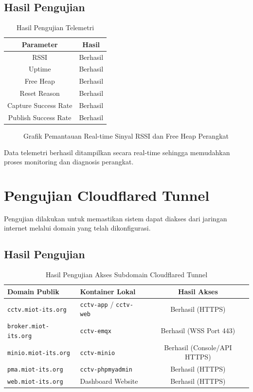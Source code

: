 \subsection{Hasil Pengujian}

\begin{table}[H]
	\centering
	\caption{Hasil Pengujian Telemetri}
	\begin{tabular}{|c|c|}
		\hline
		Parameter & Hasil \\
		\hline
		RSSI & Berhasil \\
		Uptime & Berhasil \\
		Free Heap & Berhasil \\
		Reset Reason & Berhasil \\
		Capture Success Rate & Berhasil \\
		Publish Success Rate & Berhasil \\
		\hline
	\end{tabular}
\end{table}

\begin{figure}[H]
\centering
\caption{Grafik Pemantauan Real-time Sinyal RSSI dan Free Heap Perangkat}
\label{fig:telemetry_graph}
\end{figure}

Data telemetri berhasil ditampilkan secara real-time sehingga memudahkan proses monitoring dan diagnosis perangkat.

\section{Pengujian Cloudflared Tunnel}

Pengujian dilakukan untuk memastikan sistem dapat diakses dari jaringan internet melalui domain yang telah dikonfigurasi.

\subsection{Hasil Pengujian}

\begin{table}[H]
	\centering
	\caption{Hasil Pengujian Akses Subdomain Cloudflared Tunnel}
	\begin{tabular}{|l|l|c|}
		\hline
		Domain Publik & Kontainer Lokal & Hasil Akses \\
		\hline
		\texttt{cctv.miot-its.org} & \texttt{cctv-app} / \texttt{cctv-web} & Berhasil (HTTPS) \\
		\texttt{broker.miot-its.org} & \texttt{cctv-emqx} & Berhasil (WSS Port 443) \\
		\texttt{minio.miot-its.org} & \texttt{cctv-minio} & Berhasil (Console/API HTTPS) \\
		\texttt{pma.miot-its.org} & \texttt{cctv-phpmyadmin} & Berhasil (HTTPS) \\
		\texttt{web.miot-its.org} & Dashboard Website & Berhasil (HTTPS) \\
		\hline
	\end{tabular}
\end{table}

